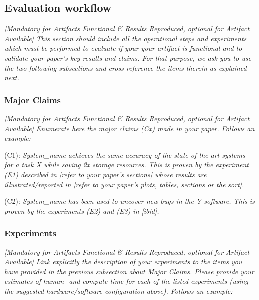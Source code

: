 \subsection{Evaluation workflow}
{\em [Mandatory for Artifacts Functional \& Results Reproduced, optional for
Artifact Available]} \textit{This section should include all the operational
steps and experiments which must be performed to evaluate if your your artifact is
functional and to validate your paper's key results and claims. For that
purpose, we ask you to use the two following subsections and cross-reference the
items therein as explained next.}

\subsubsection{Major Claims}
{\em [Mandatory for Artifacts Functional \& Results Reproduced, optional for
Artifact Available]} \textit{Enumerate here the major claims (Cx) made in your
paper. Follows an example:}\\

\begin{compactdesc}

    \item[(C1):] \textit{System\_name achieves the same accuracy of the state-of-the-art
    systems for a task X while saving 2x storage resources. This is proven by
    the experiment (E1) described in [refer to your paper's sections] whose
    results are illustrated/reported in [refer to your paper's plots, tables,
    sections or the sort].}

    \item[(C2):] \textit{System\_name has been used to uncover new bugs in the Y
    software. This is proven by the experiments (E2) and (E3) in [ibid].}

\end{compactdesc}

\subsubsection{Experiments}
{\em [Mandatory for Artifacts Functional \& Results Reproduced, optional for
Artifact Available]} \textit{Link explicitly the description of your experiments
to the items you have provided in the previous subsection about Major Claims.
Please provide your estimates of human- and compute-time for each of the listed
experiments (using the suggested hardware/software configuration above). Follows
an example:}

